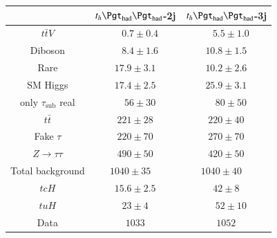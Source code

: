 \begin{table}[htbp]
\begin{tabular}{ccc} \toprule\toprule
& $t_{h}\thadhad$-2j & $t_{h}\thadhad$-3j\\\midrule
  $t\bar{t}V$              & ~~$0.7 \pm 0.4 $ & ~~$5.5 \pm 1.0 $  \\
  Diboson                  & ~~$8.4 \pm 1.6 $ & $10.8 \pm 1.5$  \\
  Rare                     & $17.9 \pm 3.1$ & $10.2 \pm 2.6$  \\ 
  SM Higgs                 & $17.4 \pm 2.5$ & $25.9 \pm 3.1$  \\ 
  only $\tau_\text{sub}$ real   & ~~$56 \pm 30   $ & ~~$80 \pm 50   $  \\  
  $t\bar{t}$               & $221 \pm 28  $ & $220 \pm 40  $  \\
  Fake $\tau$              & $220 \pm 70  $ & $270 \pm 70  $  \\  
  $Z\rightarrow\tau\tau$   & $490 \pm 50  $ & $420 \pm 50  $  \\ \midrule
  Total background         & $1040 \pm 35 $~~ & $1040 \pm 40 $~~  \\ \midrule
  $tcH$                      & $15.6 \pm 2.5$ & $42 \pm 8    $  \\ 
  $tuH$                      & $23 \pm 4    $ & ~~$52 \pm 10   $  \\ \midrule
  Data                     & $1033       $& $1052 $       \\
\bottomrule\bottomrule
\end{tabular}
\label{tab:HtautauPostfitYieldsUnblind}
\end{table}





